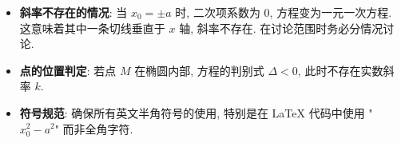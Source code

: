 \begin{trapbox}
\begin{itemize}
    \item \textbf{斜率不存在的情况}: 当 $x_0 = \pm a$ 时, 二次项系数为 $0$, 方程变为一元一次方程. 这意味着其中一条切线垂直于 $x$ 轴, 斜率不存在. 在讨论范围时务必分情况讨论.
    \item \textbf{点的位置判定}: 若点 $M$ 在椭圆内部, 方程的判别式 $\Delta < 0$, 此时不存在实数斜率 $k$.
    \item \textbf{符号规范}: 确保所有英文半角符号的使用, 特别是在 LaTeX 代码中使用 "$x_0^2 - a^2$" 而非全角字符.
\end{itemize}
\end{trapbox}